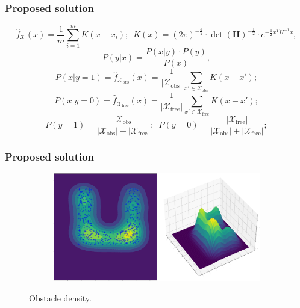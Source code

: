 \documentclass{beamer}
\begin{document}
\begin{frame}
	\frametitle{Proposed solution}	 
	\[ \hat{f}_\mathcal{X}(x) = \frac{1}{m} \sum_{i=1}^{m} K \left( x - x_{i} \right);\enspace
K(x) = (2\pi)^{-\frac{d}{2}} \cdot \det(\textbf{H})^{-\frac{1}{2}} \cdot e^{-\frac{1}{2} x^T H^{-1} x},
\] 
\[
  P(y|x) = \frac{P(x|y) \cdot P(y)}{P(x)},
\] 
\[ P(x|y=1) = \hat{f}_{\mathcal{X}_{\text{obs}}}(x) = \frac{1}{|\mathcal{X}_{\text{obs}}|} \sum_{x' \in \mathcal{X}_{\text{obs}}} K \left( x - x' \right); \]
\[ P(x|y=0) = \hat{f}_{\mathcal{X}_{\text{free}}}(x) = \frac{1}{|\mathcal{X}_{\text{free}}|} \sum_{x' \in \mathcal{X}_{\text{free}}} K \left( x - x' \right); \]
\[ P(y=1) = \frac{|\mathcal{X}_{\text{obs}}|}{|\mathcal{X}_{\text{obs}}|+|\mathcal{X}_{\text{free}}|};\enspace
P(y=0) = \frac{|\mathcal{X}_{\text{free}}|}{|\mathcal{X}_{\text{obs}}|+|\mathcal{X}_{\text{free}}|};\]
\end{frame}	


\begin{frame}
	\frametitle{Proposed solution}	
	\begin{figure}[!ht]
		\centering 
		\begin{subfigure}[b]{1\textwidth}
			\includegraphics[width=\textwidth]{figChap4/GKDE_obsU.pdf} 
		\end{subfigure}   
		\caption{Obstacle density.} 
	  \end{figure}
\end{frame}	
\end{document}
